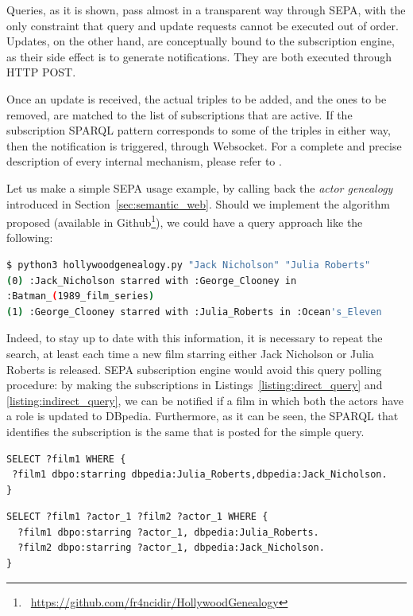 Queries, as it is shown, pass almost in a transparent way through SEPA, with the only constraint that query and update requests cannot be executed out of order. Updates, on the other hand, are conceptually bound to the subscription engine, as their side effect is to generate notifications. They are both executed through HTTP POST.

Once an update is received, the actual triples to be added, and the ones to be removed, are matched to the list of subscriptions that are active. If the subscription SPARQL pattern corresponds to some of the triples in either way, then the notification is triggered, through Websocket. For a complete and precise description of every internal mechanism, please refer to \cite{roffia2018dynamic}.

Let us make a simple SEPA usage example, by calling back the \textit{actor genealogy} introduced in Section~\ref{sec:semantic_web}. Should we implement the algorithm proposed (available in Github\footnote{\faGithub~\url{https://github.com/fr4ncidir/HollywoodGenealogy}}), we could have a query approach like the following:
\begin{lstlisting}[language=bash]
$ python3 hollywoodgenealogy.py "Jack Nicholson" "Julia Roberts"
(0) :Jack_Nicholson starred with :George_Clooney in 
:Batman_(1989_film_series)
(1) :George_Clooney starred with :Julia_Roberts in :Ocean's_Eleven
\end{lstlisting}

Indeed, to stay up to date with this information, it is necessary to repeat the search, at least each time a new film starring either Jack Nicholson or Julia Roberts is released. SEPA subscription engine would avoid this query polling procedure: by making the subscriptions in Listings~\ref{listing:direct_query} and \ref{listing:indirect_query}, we can be notified if a film in which both the actors have a role is updated to DBpedia. Furthermore, as it can be seen, the SPARQL that identifies the subscription is the same that is posted for the simple query.
\begin{lstlisting}[label={listing:direct_query}, caption={Subscription to new direct connections}]
SELECT ?film1 WHERE {
 ?film1 dbpo:starring dbpedia:Julia_Roberts,dbpedia:Jack_Nicholson.
}
\end{lstlisting}
\begin{minipage}{\linewidth}
\begin{lstlisting}[label={listing:indirect_query}, caption={Subscription to new one-step connections}]
SELECT ?film1 ?actor_1 ?film2 ?actor_1 WHERE {
  ?film1 dbpo:starring ?actor_1, dbpedia:Julia_Roberts.
  ?film2 dbpo:starring ?actor_1, dbpedia:Jack_Nicholson.
}
\end{lstlisting}
\end{minipage}


